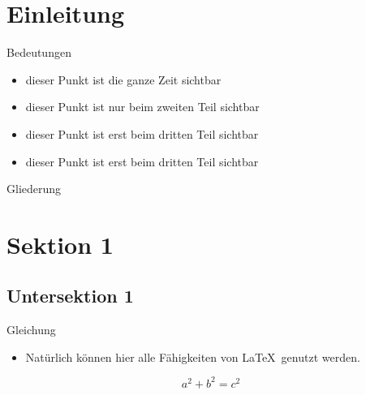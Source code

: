 



\section{Einleitung}


\begin{frame}{Bedeutungen}
	\begin{itemize}
		\item<1-> dieser Punkt ist die ganze Zeit sichtbar
		\item<2> dieser Punkt ist nur beim zweiten Teil sichtbar
		\item<3> dieser Punkt ist erst beim dritten Teil sichtbar
		\item<3> dieser Punkt ist erst beim dritten Teil sichtbar
		\end{itemize}
\end{frame}


\begin{frame}{Gliederung}
	\tableofcontents[sections={<2->},firstsection=2]
\end{frame}

\section{Sektion 1}
\subsection{Untersektion 1}
\begin{frame}{Gleichung}
	\begin{itemize}
		\item Natürlich können hier alle Fähigkeiten von \LaTeX\, genutzt werden.
	\end{itemize}
	\begin{equation}
		a^2 + b^2 = c^2
	\end{equation}
\end{frame}


